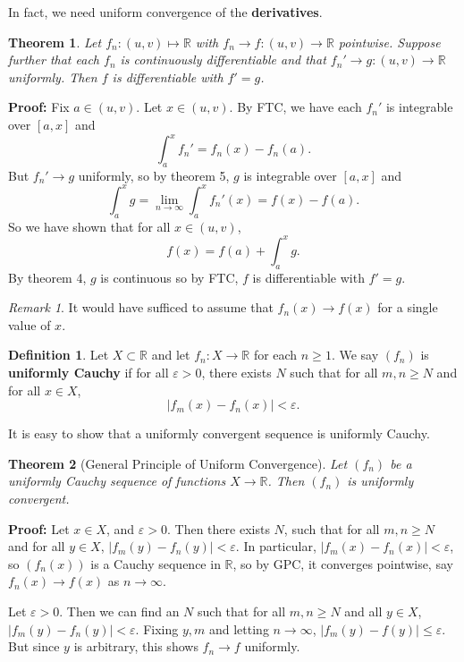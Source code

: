 \documentclass[12pt]{article}
\newtheorem{theorem}{Theorem}[section]
\theoremstyle{definition}
\newtheorem{definition}{Definition}[section]
\theoremstyle{remark}
\newtheorem*{remark}{Remark}
\begin{document}
In fact, we need uniform convergence of the \textbf{derivatives}.

\begin{theorem}
	Let $f_n : (u, v) \mapsto \mathbb{R}$ with $f_n \to f : (u, v) \to \mathbb{R}$ pointwise. Suppose further that each $f_n$ is continuously differentiable and that $f_n' \to g : (u, v) \to \mathbb{R}$ uniformly. Then $f$ is differentiable with $f' = g$.
\end{theorem}

\begin{adjustbox}{minipage = \columnwidth - 25.5pt, margin=1em, frame=1pt, margin=0em}
	\textbf{Proof:} Fix $a \in (u, v)$. Let $x \in (u, v)$. By FTC, we have each $f_n'$ is integrable over $[a, x]$ and
	\[
		\int_{a}^{x}f_n' = f_n(x) - f_n(a)
	.\]
	But $f_n' \to g$ uniformly, so by theorem 5, $g$ is integrable over $[a, x]$ and
	\[
		\int_{a}^{x}g = \lim_{n \to \infty} \int_{a}^{x} f_n' (x) = f(x) - f(a)
	.\]
	So we have shown that for all $x \in (u, v)$,
	\[
		f(x) = f(a) + \int_{a}^{x} g
	.\]
	By theorem 4, $g$ is continuous so by FTC, $f$ is differentiable with $f' = g$.
\end{adjustbox}

\begin{remark}
	It would have sufficed to assume that $f_n(x) \to f(x)$ for a single value of $x$.
\end{remark}

\begin{definition}
	Let $X \subset \mathbb{R}$ and let $f_n : X \to \mathbb{R}$ for each $n \geq 1$. We say $(f_n)$ is \textbf{uniformly Cauchy} if for all $\varepsilon > 0$, there exists $N$ such that for all $m, n \geq N$ and for all $x \in X$,
	\[
		|f_m(x) - f_n(x)| < \varepsilon
	.\]
\end{definition}
It is easy to show that a uniformly convergent sequence is uniformly Cauchy.

\begin{theorem}[General Principle of Uniform Convergence]
	Let $(f_n)$ be a uniformly Cauchy sequence of functions $X \to \mathbb{R}$. Then $(f_n)$ is uniformly convergent.
\end{theorem}

\begin{adjustbox}{minipage = \columnwidth - 25.5pt, margin=1em, frame=1pt, margin=0em}
	\textbf{Proof:} Let $x \in X$, and $\varepsilon > 0$. Then there exists $N$, such that for all $m, n \geq N$ and for all $y \in X$, $|f_m(y) - f_n(y)| < \varepsilon$. In particular, $|f_m(x) - f_n(x)| < \varepsilon$, so $(f_n(x))$ is a Cauchy sequence in $\mathbb{R}$, so by GPC, it converges pointwise, say $f_n(x) \to f(x)$ as $n \to \infty$.

	Let $\varepsilon > 0$. Then we can find an $N$ such that for all $m, n \geq N$ and all $y \in X$, $|f_m(y) - f_n(y)| < \varepsilon$. Fixing $y, m$ and letting $n \to \infty$, $|f_m(y) - f(y)| \leq \varepsilon$. But since $y$ is arbitrary, this shows $f_n \to f$ uniformly.
\end{adjustbox}
\end{document}

